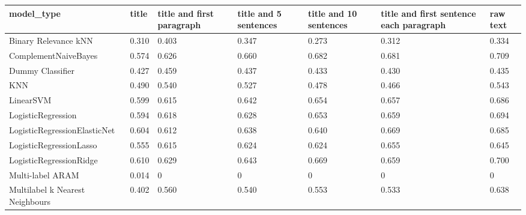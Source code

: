 \begin{tabular}{lllllll}
\toprule
                     model\_type & title & title and first paragraph & title and 5 sentences & title and 10 sentences & title and first sentence each paragraph &  raw text \\
\midrule
           Binary Relevance kNN & 0.310 &                     0.403 &                 0.347 &                  0.273 &                                   0.312 &     0.334 \\
           ComplementNaiveBayes & 0.574 &                     0.626 &                 0.660 &                  0.682 &                                   0.681 &     0.709 \\
               Dummy Classifier & 0.427 &                     0.459 &                 0.437 &                  0.433 &                                   0.430 &     0.435 \\
                            KNN & 0.490 &                     0.540 &                 0.527 &                  0.478 &                                   0.466 &     0.543 \\
                      LinearSVM & 0.599 &                     0.615 &                 0.642 &                  0.654 &                                   0.657 &     0.686 \\
             LogisticRegression & 0.594 &                     0.618 &                 0.628 &                  0.653 &                                   0.659 &     0.694 \\
   LogisticRegressionElasticNet & 0.604 &                     0.612 &                 0.638 &                  0.640 &                                   0.669 &     0.685 \\
        LogisticRegressionLasso & 0.555 &                     0.615 &                 0.624 &                  0.624 &                                   0.655 &     0.645 \\
        LogisticRegressionRidge & 0.610 &                     0.629 &                 0.643 &                  0.669 &                                   0.659 &     0.700 \\
               Multi-label ARAM & 0.014 &                         0 &                     0 &                      0 &                                       0 &         0 \\
Multilabel k Nearest Neighbours & 0.402 &                     0.560 &                 0.540 &                  0.553 &                                   0.533 &     0.638 \\

\end{tabular}
